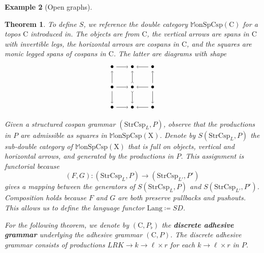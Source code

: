 \documentclass{amsart}
\newcommand{\C}{\cat{C}}
\newcommand{\X}{\cat{X}}
\newcommand{\StrCsp}{\cat{StrCsp}}
\newcommand{\MonSpCsp}{\dblcat{M} \cat{onSpCsp}}
\newcommand{\Lang}{\mathrm{Lang}}
\newcommand{\defn}[1]{\textbf{#1}}
\newcommand{\cat}[1]{\mathrm{#1}}
\newcommand{\dblcat}[1]{\mathbb{#1}}
\newcommand{\from}{\colon}
\newtheorem{theorem}{Theorem}[section]
\theoremstyle{remark}
\theoremstyle{definition}
\newtheorem{example}[theorem]{Example}
\begin{document}
\begin{example}[Open graphs]
{{\begin{theorem}
To define $ S $, we reference the double category $ \MonSpCsp (\C) $
for a topos $ \C $ introduced in.
%
The objects are from $ \C $, the vertical arrows are spans in $ \C $
with invertible legs, the horizontal arrows are cospans in $ \C $, and
the squares are monic legged spans of cospans in $ \C $. The latter
are diagrams with shape
%
\[
\begin{tikzpicture}
  \node (00) at (0,0) {$ \bullet $};
  \node (01) at (0,1) {$ \bullet $};
  \node (02) at (0,2) {$ \bullet $};
  \node (10) at (1,0) {$ \bullet $};
  \node (11) at (1,1) {$ \bullet $};
  \node (12) at (1,2) {$ \bullet $};
  \node (20) at (2,0) {$ \bullet $};
  \node (21) at (2,1) {$ \bullet $};
  \node (22) at (2,2) {$ \bullet $};
  \draw [->] (02) to node [] {\scriptsize{$  $}} (12);
  \draw [->] (22) to node [] {\scriptsize{$  $}} (12);
  \draw [->] (01) to node [] {\scriptsize{$  $}} (11);
  \draw [->] (21) to node [] {\scriptsize{$  $}} (11);
  \draw [->] (00) to node [] {\scriptsize{$  $}} (10);
  \draw [->] (20) to node [] {\scriptsize{$  $}} (10);
  \draw [->] (01) to node [] {\scriptsize{$  $}} (02);
  \draw [->] (01) to node [] {\scriptsize{$  $}} (00);
  \draw [>->] (11) to node [] {\scriptsize{$  $}} (12);
  \draw [>->] (11) to node [] {\scriptsize{$  $}} (10);
  \draw [->] (21) to node [] {\scriptsize{$  $}} (22);
  \draw [->] (21) to node [] {\scriptsize{$  $}} (20);
\end{tikzpicture}
\]
%

Given a structured cospan grammar $ ( \StrCsp_L , P ) $, observe that
the productions in $ P $ are admissible as squares in
$ \MonSpCsp (\X) $. Denote by $ S ( \StrCsp_L , P ) $ the sub-double
category of $ \MonSpCsp ( \X ) $ that is full on objects, vertical and
horizontal arrows, and generated by the productions in
$ P $. This assignment is functorial
%
%
because
%
\[
  (F,G) \from ( \StrCsp_{L} , P ) \to ( \StrCsp_{L'} , P' )
\]
% 
gives a mapping between the generators of $ S ( \StrCsp_{L} , P ) $
and $ S ( \StrCsp_{L'} , P' ) $.  Composition holds because
$ F $ and $ G $ are both preserve pullbacks and pushouts. This allows
us to define the language functor $ \Lang \coloneqq SD $.  

For the following theorem, we denote by $ ( \C , P_{\flat} ) $ the
\defn{discrete adhesive grammar} underlying the adhesive grammar $ (
\C , P ) $. The discrete adhesive grammar consists of productions $
LRK \to k \to \ell \times r $ for each $ k \to \ell \times r $ in $ P $. 


\end{theorem}}}
\end{example}
\end{document}
